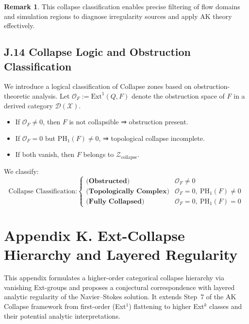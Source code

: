 \documentclass[11pt]{article}
\theoremstyle{definition}
\newtheorem{remark}[theorem]{Remark}
\begin{document}
\begin{remark}
This collapse classification enables precise filtering of flow domains and simulation regions  
to diagnose irregularity sources and apply AK theory effectively.
\end{remark}

\subsection*{J.14 Collapse Logic and Obstruction Classification}

We introduce a logical classification of Collapse zones based on obstruction-theoretic analysis.  
Let $\mathcal{O}_F := \mathrm{Ext}^1(Q, F)$ denote the obstruction space of $F$ in a derived category $\mathcal{D}(\mathcal{X})$.

\begin{itemize}
  \item If $\mathcal{O}_F \ne 0$, then $F$ is not collapsible ⇒ obstruction present.
  \item If $\mathcal{O}_F = 0$ but $\mathrm{PH}_1(F) \ne 0$, ⇒ topological collapse incomplete.
  \item If both vanish, then $F$ belongs to $\mathcal{Z}_{\mathrm{collapse}}$.
\end{itemize}

We classify:
\[
\text{Collapse Classification:}
\begin{cases}
\textbf{(Obstructed)} & \mathcal{O}_F \ne 0 \\
\textbf{(Topologically Complex)} & \mathcal{O}_F = 0, \ \mathrm{PH}_1(F) \ne 0 \\
\textbf{(Fully Collapsed)} & \mathcal{O}_F = 0, \ \mathrm{PH}_1(F) = 0
\end{cases}
\]





\section*{Appendix K. Ext-Collapse Hierarchy and Layered Regularity}

This appendix formulates a higher-order categorical collapse hierarchy via vanishing Ext-groups and proposes a conjectural correspondence with layered analytic regularity of the Navier--Stokes solution.  
It extends Step~7 of the AK Collapse framework from first-order (Ext$^1$) flattening to higher Ext$^k$ classes and their potential analytic interpretations.
\end{document}
